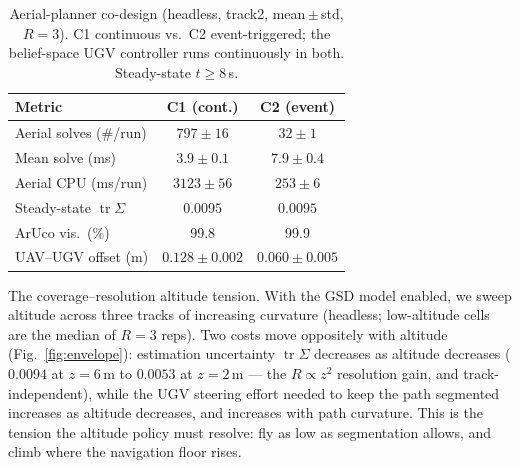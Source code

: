 \documentclass[letterpaper, 10 pt, conference]{ieeeconf}  %
\DeclareMathOperator{\tr}{tr}
\newcommand{\RESsolvesCone}{\ensuremath{797\pm16}}\newcommand{\RESsolvesCthree}{\ensuremath{32\pm1}}
\newcommand{\RESmsCone}{\ensuremath{3.9\pm0.1}}\newcommand{\RESmsCthree}{\ensuremath{7.9\pm0.4}}
\newcommand{\REScpuCone}{\ensuremath{3123\pm56}}\newcommand{\REScpuCthree}{\ensuremath{253\pm6}}
\newcommand{\RESoffCone}{\ensuremath{0.128\pm0.002}}\newcommand{\RESoffCthree}{\ensuremath{0.060\pm0.005}}
\newcommand{\REScov}{\ensuremath{0.0095}}\newcommand{\RESsolveRed}{25}\newcommand{\REScpuRed}{12}
\begin{document}
\begin{table}[h]
\caption{Aerial-planner co-design (headless, track2, mean\,$\pm$\,std, $R{=}3$). C1 continuous
vs.\ C2 event-triggered; the belief-space UGV controller runs continuously in both.
Steady-state $t\!\ge\!8$\,s.}
\label{tab:results}
\begin{center}
\footnotesize
\setlength{\tabcolsep}{3pt}
\begin{tabular}{|l|c|c|}
\hline
 {Metric} &  {C1 (cont.)} &  {C2 (event)}\\
\hline
Aerial solves (\#/run) & \RESsolvesCone & \RESsolvesCthree\\
\hline
Mean solve (ms) & \RESmsCone & \RESmsCthree\\
\hline
Aerial CPU (ms/run) & \REScpuCone & \REScpuCthree\\
\hline
Steady-state $\tr\Sigma$ & \REScov & \REScov\\
\hline
ArUco vis.\ (\%) & 99.8 & 99.9\\
\hline
UAV--UGV offset (m) & \RESoffCone & \RESoffCthree\\
\hline
\end{tabular}
\end{center}
\end{table}

 {The coverage--resolution altitude tension.} With the GSD model enabled, we sweep
altitude across three tracks of increasing curvature (headless; low-altitude cells are the
median of $R{=}3$ reps). Two costs move oppositely with altitude (Fig.~\ref{fig:envelope}):
estimation uncertainty $\tr\Sigma$ {decreases} as altitude decreases ($0.0094$ at
$z{=}6$\,m to $0.0053$ at $z{=}2$\,m --- the $R\propto z^2$ resolution gain, and
track-independent), while the UGV steering effort needed to keep the path segmented
{increases} as altitude decreases, and increases with path curvature. This is the tension
the altitude policy must resolve: fly as low as segmentation allows, and climb where the
navigation floor rises.
\end{document}
